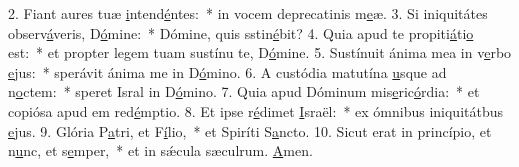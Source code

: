 2. Fiant aures tuæ \uline{i}ntend\uline{é}ntes:~* in vocem deprecatinis m\uline{e}æ.
3. Si iniquitátes observ\uline{á}veris, D\uline{ó}mine:~* Dómine, quis sstin\uline{é}bit?
4. Quia apud te propiti\uline{á}ti\uline{o} est:~* et propter legem tuam sustínu te, D\uline{ó}mine.
5. Sustínuit ánima mea in v\uline{e}rbo \uline{e}jus:~* sperávit ánima me in D\uline{ó}mino.
6. A custódia matutína \uline{u}sque ad n\uline{o}ctem:~* speret Isral in D\uline{ó}mino.
7. Quia apud Dóminum mis\uline{e}ric\uline{ó}rdia:~* et copiósa apud em red\uline{é}mptio.
8. Et ipse r\uline{é}dimet \uline{I}sraël:~* ex ómnibus iniquitátbus \uline{e}jus.
9. Glória P\uline{a}tri, et F\uline{í}lio,~* et Spiríti S\uline{a}ncto.
10. Sicut erat in princípio, et n\uline{u}nc, et s\uline{e}mper,~* et in sǽcula sæculrum. \uline{A}men.
